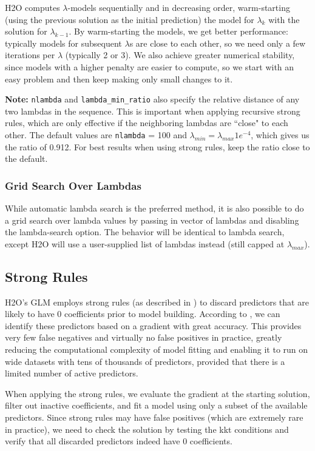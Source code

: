 H2O computes $\lambda$-models sequentially and in decreasing order, warm-starting (using the previous solution as the initial prediction) the model for $\lambda_k$ with the solution for $\lambda_{k-1}$. By warm-starting the models, we get better performance: typically models for subsequent $\lambda$s are close to each other, so we need only a few iterations per $\lambda$ (typically 2 or 3). We also achieve greater numerical stability, since models with a higher penalty are easier to compute, so we start with an easy problem and then keep making only small changes to it.

\textbf{Note:} \texttt{nlambda} and \texttt{lambda\_min\_ratio} also specify the relative distance of any two lambdas in the sequence. This is important when applying recursive strong rules, which are only effective if the neighboring lambdas are ``close" to each other. The default values are \texttt{nlambda} = 100 and $\lambda_{min} = \lambda_{max} 1e^{-4}$, which gives us the ratio of 0.912.   For best results when using strong rules, keep the ratio close to the default.  
    
\subsubsection{Grid Search Over Lambdas}
While automatic lambda search is the preferred method, it is also possible to do a grid search over lambda values by passing in vector of lambdas and disabling the lambda-search option. The behavior will be identical to lambda search, except H2O will use a user-supplied list of lambdas instead (still capped at $\lambda_{max}$).

\subsection{Strong Rules} %
H2O's GLM employs strong rules (as described in ) to discard predictors that are likely to have 0 coefficients prior to model building. According to , we can identify these predictors based on a gradient with great accuracy. This provides very few false negatives and virtually no false positives in practice, greatly reducing the computational complexity of model fitting and enabling it to run on wide datasets with tens of thousands of predictors, provided that there is a limited number of active predictors. 

When applying the strong rules, we evaluate the gradient at the starting solution, filter out inactive coefficients, and fit a model using only a subset of the available predictors. Since strong rules may have false positives (which are extremely rare in practice), we need to check the solution by testing the kkt conditions and verify that all discarded predictors indeed have 0 coefficients.  


